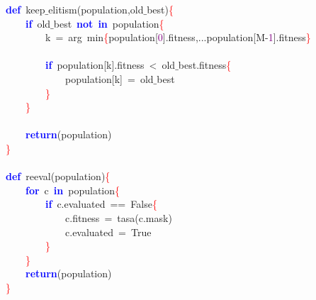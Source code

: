 \noindent
\mbox{}\textbf{\textcolor{Blue}{def}}\ keep$\_$elitism\textcolor{BrickRed}{(}population\textcolor{BrickRed}{,}old$\_$best\textcolor{BrickRed}{)}\textcolor{Red}{\{} \\
\mbox{}\ \ \ \ \textbf{\textcolor{Blue}{if}}\ old$\_$best\ \textbf{\textcolor{Blue}{not}}\ \textbf{\textcolor{Blue}{in}}\ population\textcolor{Red}{\{} \\
\mbox{}\ \ \ \ \ \ \ \ k\ \textcolor{BrickRed}{=}\ arg\ min\textcolor{Red}{\{}population\textcolor{BrickRed}{[}\textcolor{Purple}{0}\textcolor{BrickRed}{].}fitness\textcolor{BrickRed}{,...}population\textcolor{BrickRed}{[}M\textcolor{BrickRed}{-}\textcolor{Purple}{1}\textcolor{BrickRed}{].}fitness\textcolor{Red}{\}} \\
\mbox{} \\
\mbox{}\ \ \ \ \ \ \ \ \textbf{\textcolor{Blue}{if}}\ population\textcolor{BrickRed}{[}k\textcolor{BrickRed}{].}fitness\ \textcolor{BrickRed}{\textless{}}\ old$\_$best\textcolor{BrickRed}{.}fitness\textcolor{Red}{\{} \\
\mbox{}\ \ \ \ \ \ \ \ \ \ \ \ population\textcolor{BrickRed}{[}k\textcolor{BrickRed}{]}\ \textcolor{BrickRed}{=}\ old$\_$best \\
\mbox{}\ \ \ \ \ \ \ \ \textcolor{Red}{\}} \\
\mbox{}\ \ \ \ \textcolor{Red}{\}} \\
\mbox{} \\
\mbox{}\ \ \ \ \textbf{\textcolor{Blue}{return}}\textcolor{BrickRed}{(}population\textcolor{BrickRed}{)} \\
\mbox{}\textcolor{Red}{\}} \\
\mbox{} \\
\mbox{}\textbf{\textcolor{Blue}{def}}\ reeval\textcolor{BrickRed}{(}population\textcolor{BrickRed}{)}\textcolor{Red}{\{} \\
\mbox{}\ \ \ \ \textbf{\textcolor{Blue}{for}}\ c\ \textbf{\textcolor{Blue}{in}}\ population\textcolor{Red}{\{} \\
\mbox{}\ \ \ \ \ \ \ \ \textbf{\textcolor{Blue}{if}}\ c\textcolor{BrickRed}{.}evaluated\ \textcolor{BrickRed}{==}\ False\textcolor{Red}{\{} \\
\mbox{}\ \ \ \ \ \ \ \ \ \ \ \ c\textcolor{BrickRed}{.}fitness\ \textcolor{BrickRed}{=}\ tasa\textcolor{BrickRed}{(}c\textcolor{BrickRed}{.}mask\textcolor{BrickRed}{)} \\
\mbox{}\ \ \ \ \ \ \ \ \ \ \ \ c\textcolor{BrickRed}{.}evaluated\ \textcolor{BrickRed}{=}\ True \\
\mbox{}\ \ \ \ \ \ \ \ \textcolor{Red}{\}} \\
\mbox{}\ \ \ \ \textcolor{Red}{\}} \\
\mbox{}\ \ \ \ \textbf{\textcolor{Blue}{return}}\textcolor{BrickRed}{(}population\textcolor{BrickRed}{)} \\
\mbox{}\textcolor{Red}{\}} \\
\mbox{}
